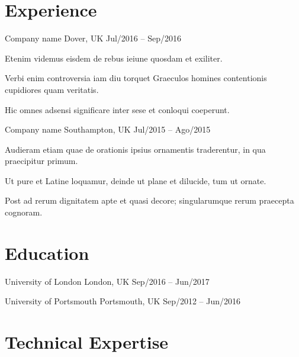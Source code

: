 \documentclass[a4paper,10pt,oneside]{simplex-cv}
\begin{document}
    \section{Experience}
        {Company name}%
        {Dover, UK}%
        {Jul/2016 -- Sep/2016}%
        {%
            \item Etenim videmus eisdem de rebus ieiune quosdam et exiliter.
            \item Verbi enim controversia iam diu torquet Graeculos homines contentionis cupidiores quam veritatis.
            \item Hic omnes adsensi significare inter sese et conloqui coeperunt.
        }
    
        {Company name}%
        {Southampton, UK}%
        {Jul/2015 -- Ago/2015}%
        {%
            \item Audieram etiam quae de orationis ipsius ornamentis traderentur, in qua praecipitur primum.
            \item Ut pure et Latine loquamur, deinde ut plane et dilucide, tum ut ornate.
            \item Post ad rerum dignitatem apte et quasi decore; singularumque rerum praecepta cognoram.
        }


    \section{Education} 
        {University of London}%
        {London, UK}%
        {Sep/2016 -- Jun/2017}%
            
        {University of Portsmouth}%
        {Portsmouth, UK}%
        {Sep/2012 -- Jun/2016}%
            


    \section{Technical Expertise}
\end{document}
